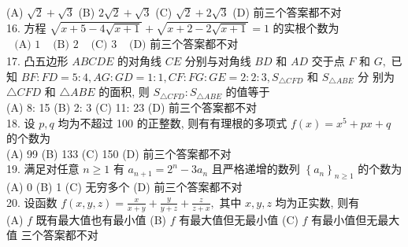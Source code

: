 (A) $\sqrt{2}+\sqrt{3}$
(B) $2 \sqrt{2}+\sqrt{3}$
(C) $\sqrt{2}+2 \sqrt{3}$
(D) 前三个答案都不对\\
16. 方程 $\sqrt{x+5-4 \sqrt{x+1}}+\sqrt{x+2-2 \sqrt{x+1}}=1$ 的实根个数为\\
$\begin{array}{lll}\text { (A) } 1 & \text { (B) } 2 & \text { (C) } 3 & \text { (D) 前三个答案都不对 }\end{array}$\\
17. 凸五边形 $A B C D E$ 的对角线 $C E$ 分别与对角线 $B D$ 和 $A D$ 交于点 $F$ 和 $G,$ 已知 $B F: F D=5: 4, A G: G D=1: 1, C F: F G: G E=2: 2: 3, S_{\triangle C F D}$ 和 $S_{\triangle A B E}$ 分
别为 $\triangle C F D$ 和 $\triangle A B E$ 的面积, 则 $S_{\triangle C F D}: S_{\triangle A B E}$ 的值等于\\
(A) 8: 15
(B) 2: 3
(C) 11: 23
(D) 前三个答案都不对\\
18. 设 $p, q$ 均为不超过 100 的正整数, 则有有理根的多项式 $f(x)=x^{5}+p x+q$ 的个数为\\
(A) 99
(B) 133
(C) 150
(D) 前三个答案都不对\\
19. 满足对任意 $n \geq 1$ 有 $a_{n+1}=2^{n}-3 a_{n}$ 且严格递增的数列 $\left\{a_{n}\right\}_{n \geq 1}$ 的个数为\\
(A) 0
(B) 1
(C) 无穷多个
(D) 前三个答案都不对\\
20. 设函数 $f(x, y, z)=\frac{x}{x+y}+\frac{y}{y+z}+\frac{z}{z+x},$ 其中 $x, y, z$ 均为正实数, 则有\\
(A) $f$ 既有最大值也有最小值
(B) $f$ 有最大值但无最小值
(C) $f$ 有最小值但无最大值
三个答案都不对

